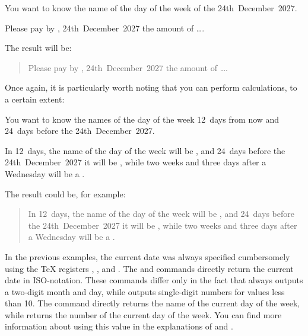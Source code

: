 \begin{Example}
  You want to know the name of the day of the week of the 24th~December~2027.
\begin{lstcode}
  Please pay by ,
  24th~December~2027 the amount of \dots.
\end{lstcode}
  The result will be:
  \begin{quote}
    Please pay by ,
    24th~December~2027 the amount of \dots.
  \end{quote}
\end{Example}

Once again, it is particularly worth noting that you can perform calculations,
to a certain extent:
\begin{Example}
  You want to know the names of the day of the week 12~days from now
  and 24~days before the 24th~December~2027.
\begin{lstcode}
  In 12~days, the name of the day of the week
  will be , and
  24~days before the 24th~December~2027 it will be
  , while two weeks
  and three days after a Wednesday will be a
  .
\end{lstcode}
  The result could be, for example:
  \begin{quote}
    In 12~days, the name of the day of the week
    will be , and
    24~days before the 24th~December~2027 it will be
    , while two weeks
    and three days after a Wednesday will be a
    .
  \end{quote}
\end{Example}%
%
\EndIndexGroup


\begin{Declaration}
\end{Declaration}%
In the previous examples, the current date was always specified cumbersomely
using the \TeX{} registers ,
, and . The
 and 
commands directly return the current date in ISO-notation. These commands
differ only in the fact that  always outputs a two-digit month
and day, while  outputs single-digit numbers for values less
than 10. The  command directly returns the name of the
current day of the week, while  returns the number of the
current day of the week. You can find more information about using this value
in the explanations of  and
.


